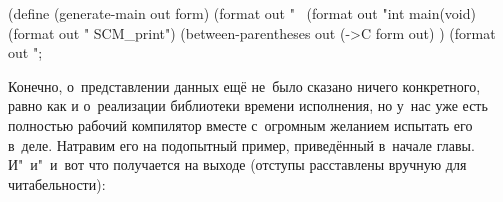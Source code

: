 \begin{code:lisp}
(define (generate-main out form)
  (format out "~%
  (format out "int main(void)~%
  (format out "    SCM_print")
  (between-parentheses out
    (->C form out) )
  (format out ";~%
\end{code:lisp}

Конечно, о~представлении данных ещё не~было сказано ничего конкретного, равно
как и о~реализации библиотеки времени исполнения, но у~нас уже есть полностью
рабочий компилятор вместе с~огромным желанием испытать его в~деле. Натравим его
на подопытный пример, приведённый в~начале главы.
 И"~и"~и\textdots\ вот что получается на
выходе (отступы расставлены вручную для читабельности):

